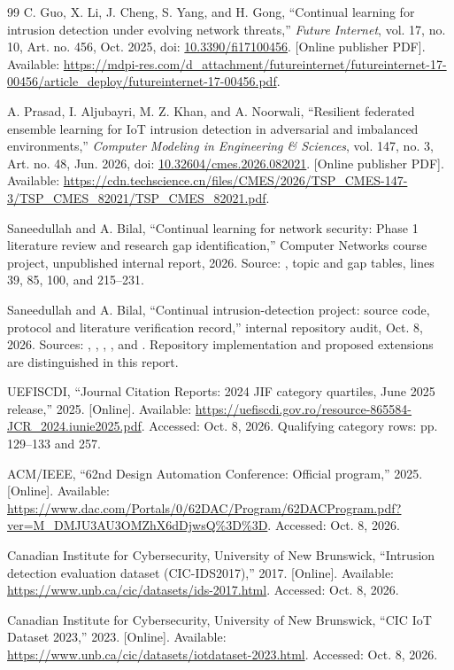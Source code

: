 \documentclass[10pt,a4paper]{article}
\begin{document}
\begin{thebibliography}{99}
C. Guo, X. Li, J. Cheng, S. Yang, and H. Gong,
``Continual learning for intrusion detection under evolving network threats,''
\emph{Future Internet}, vol. 17, no. 10, Art. no. 456, Oct. 2025,
doi: \href{https://doi.org/10.3390/fi17100456}{10.3390/fi17100456}.
[Online publisher PDF]. Available: \url{https://mdpi-res.com/d_attachment/futureinternet/futureinternet-17-00456/article_deploy/futureinternet-17-00456.pdf}.

A. Prasad, I. Aljubayri, M. Z. Khan, and A. Noorwali,
``Resilient federated ensemble learning for IoT intrusion detection in adversarial and imbalanced environments,''
\emph{Computer Modeling in Engineering \& Sciences}, vol. 147, no. 3, Art. no. 48, Jun. 2026,
doi: \href{https://doi.org/10.32604/cmes.2026.082021}{10.32604/cmes.2026.082021}.
[Online publisher PDF]. Available: \url{https://cdn.techscience.cn/files/CMES/2026/TSP_CMES-147-3/TSP_CMES_82021/TSP_CMES_82021.pdf}.

Saneedullah and A. Bilal, ``Continual learning for network security: Phase 1 literature review and research gap identification,'' Computer Networks course project, unpublished internal report, 2026. Source: , topic and gap tables, lines 39, 85, 100, and 215--231.

Saneedullah and A. Bilal, ``Continual intrusion-detection project: source code, protocol and literature verification record,'' internal repository audit, Oct. 8, 2026. Sources: , , , , and . Repository implementation and proposed extensions are distinguished in this report.

UEFISCDI, ``Journal Citation Reports: 2024 JIF category quartiles, June 2025 release,'' 2025. [Online]. Available: \url{https://uefiscdi.gov.ro/resource-865584-JCR_2024.iunie2025.pdf}. Accessed: Oct. 8, 2026. Qualifying category rows: pp. 129--133 and 257.

ACM/IEEE, ``62nd Design Automation Conference: Official program,'' 2025. [Online]. Available: \url{https://www.dac.com/Portals/0/62DAC/Program/62DACProgram.pdf?ver=M_DMJU3AU3OMZhX6dDjwsQ%3D%3D}. Accessed: Oct. 8, 2026.

Canadian Institute for Cybersecurity, University of New Brunswick, ``Intrusion detection evaluation dataset (CIC-IDS2017),'' 2017. [Online]. Available: \url{https://www.unb.ca/cic/datasets/ids-2017.html}. Accessed: Oct. 8, 2026.

Canadian Institute for Cybersecurity, University of New Brunswick, ``CIC IoT Dataset 2023,'' 2023. [Online]. Available: \url{https://www.unb.ca/cic/datasets/iotdataset-2023.html}. Accessed: Oct. 8, 2026.
\end{thebibliography}
\end{document}
